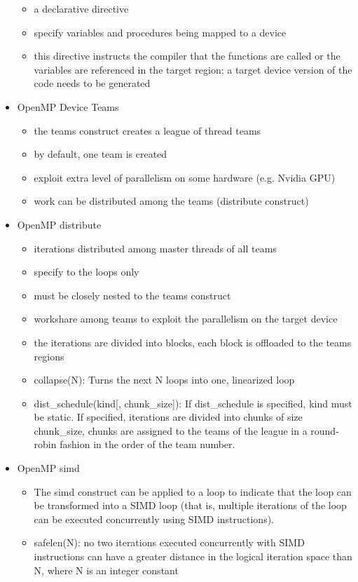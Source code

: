 \documentclass[paper=a4, fontsize=11pt]{scrartcl} %
\numberwithin{equation}{section} %
\numberwithin{figure}{section} %
\numberwithin{table}{section} %
\begin{document}
\begin{itemize}
\begin{itemize}
    \item a declarative directive
    \item specify variables and procedures being mapped to a device
    \item this directive instructs the compiler that the functions are called or the variables are referenced in the target region; a target device version of the code needs to be generated
  \end{itemize}
  \item OpenMP Device Teams
  \begin{itemize}
    \item the teams construct creates a league of thread teams
    \item by default, one team is created
    \item exploit extra level of parallelism on some hardware (e.g. Nvidia GPU)
    \item work can be distributed among the teams (distribute construct)
  \end{itemize}
  \item OpenMP distribute
  \begin{itemize}
    \item iterations distributed among master threads of all teams
    \item specify to the loops only
    \item must be closely nested to the teams construct
    \item workshare among teams to exploit the parallelism on the target device
    \item the iterations are divided into blocks, each block is offloaded to the teams regions
    \item collapse(N): Turns the next N loops into one, linearized loop
    \item dist_schedule(kind[, chunk_size]): If dist_schedule is specified, kind must be static. If specified, iterations are divided into chunks of size chunk_size, chunks are assigned to the teams of the league in a round-robin fashion in the order of the team number.
  \end{itemize}
  \item OpenMP simd
  \begin{itemize}
    \item The simd construct can be applied to a loop to indicate that the loop can be transformed into a SIMD loop (that is, multiple iterations of the loop can be executed concurrently using SIMD instructions).
    \item safelen(N): no two iterations executed concurrently with SIMD instructions can have a greater distance in the logical iteration space than N, where N is an integer constant

\end{itemize}
\end{itemize}
\end{document}
